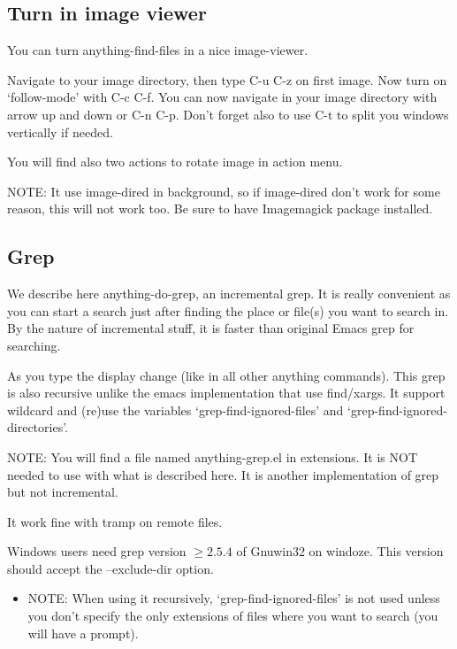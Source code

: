 \documentclass[a4paper,11pt]{article}
\begin{document}
\subsection{Turn in image viewer}
\label{sec:turn-image-viewer}
You can turn anything-find-files in a nice image-viewer.

Navigate to your image directory, then type C-u C-z on first image.
Now turn on `follow-mode' with C-c C-f.
You can now navigate in your image directory with arrow up and down or C-n C-p.
Don't forget also to use C-t to split you windows vertically if needed.

You will find also two actions to rotate image in action menu. 

NOTE:
It use image-dired in background, so if image-dired don't work for some reason, this will
not work too.
Be sure to have Imagemagick package installed.

\subsection{Grep}
\label{sec:grep}
We describe here anything-do-grep, an incremental grep.
It is really convenient as you can start a search just after finding the place or file(s) you want to search in.
By the nature of incremental stuff, it is faster than original Emacs grep for searching.

As you type the display change (like in all other anything commands).
This grep is also recursive unlike the emacs implementation that use find/xargs.
It support wildcard and (re)use the variables `grep-find-ignored-files'
and `grep-find-ignored-directories'.

NOTE: You will find a file named anything-grep.el in extensions.
It is NOT needed to use with what is described here.
It is another implementation of grep but not incremental.

It work fine with tramp on remote files.

Windows users need grep version 
\begin{math}
\geq2.5.4
\end{math}
of Gnuwin32 on windoze.
This version should accept the --exclude-dir option.

\begin{itemize}
\item NOTE:
When using it recursively, `grep-find-ignored-files' is not used unless you don't specify
the only extensions of files where you want to search (you will have a prompt).
\end{itemize}
\end{document}
